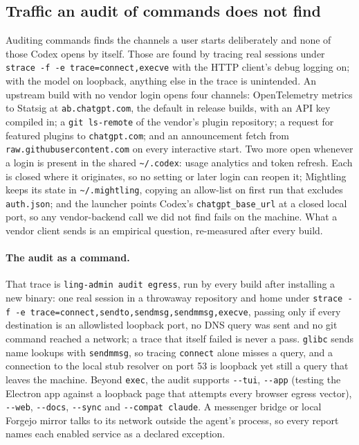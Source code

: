 \documentclass[11pt]{article}
\newcommand{\code}[1]{\texttt{#1}}
\begin{document}
\subsection{Traffic an audit of commands does not find}
\label{sec:egress}

Auditing commands finds the channels a user starts deliberately and none of those Codex opens by
itself. Those are found by tracing real sessions under \code{strace -f -e trace=connect,execve} with
the HTTP client's debug logging on; with the model on loopback, anything else in the trace is
unintended. An upstream build with no vendor login opens four channels: OpenTelemetry metrics to
Statsig at \code{ab.chatgpt.com}, the default in release builds, with an API key compiled in; a
\code{git ls-remote} of the vendor's plugin repository; a request for featured plugins to
\code{chatgpt.com}; and an announcement fetch from \code{raw.githubusercontent.com} on every
interactive start. Two more open whenever a login is present in the shared
\code{\textasciitilde/.codex}: usage analytics and token refresh. Each is closed where it originates,
so no setting or later login can reopen it; Mightling keeps its state in
\code{\textasciitilde/.mightling}, copying an allow-list on first run that excludes
\code{auth.json}; and the launcher points Codex's \code{chatgpt\_base\_url} at a closed local port,
so any vendor-backend call we did not find fails on the machine. What a vendor client sends is an
empirical question, re-measured after every build.

\paragraph{The audit as a command.} That trace is \code{ling-admin audit egress}, run by every
build after installing a new binary: one real session in a throwaway repository and home under
\code{strace -f -e trace=connect,sendto,sendmsg,sendmmsg,execve}, passing only if every destination
is an allowlisted loopback port, no DNS query was sent and no git command reached a network; a
trace that itself failed is never a pass. \code{glibc} sends name lookups with \code{sendmmsg}, so
tracing \code{connect} alone misses a query, and a connection to the local stub resolver on port 53
is loopback yet still a query that leaves the machine. Beyond \code{exec}, the audit supports
\code{-{}-tui}, \code{-{}-app} (testing the Electron app against a loopback page that attempts
every browser egress vector), \code{-{}-web}, \code{-{}-docs}, \code{-{}-sync} and
\code{-{}-compat claude}. A messenger bridge or local Forgejo mirror talks to its network outside
the agent's process, so every report names each enabled service as a declared exception.
\end{document}
